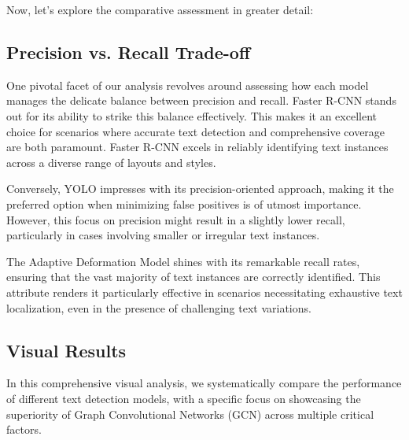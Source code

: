 
Now, let's explore the comparative assessment in greater detail:

\subsection{Precision vs. Recall Trade-off}
One pivotal facet of our analysis revolves around assessing how each model manages the delicate balance between precision and recall. Faster R-CNN stands out for its ability to strike this balance effectively. This makes it an excellent choice for scenarios where accurate text detection and comprehensive coverage are both paramount. Faster R-CNN excels in reliably identifying text instances across a diverse range of layouts and styles.

Conversely, YOLO impresses with its precision-oriented approach, making it the preferred option when minimizing false positives is of utmost importance. However, this focus on precision might result in a slightly lower recall, particularly in cases involving smaller or irregular text instances.

The Adaptive Deformation Model shines with its remarkable recall rates, ensuring that the vast majority of text instances are correctly identified. This attribute renders it particularly effective in scenarios necessitating exhaustive text localization, even in the presence of challenging text variations.



\subsection{Visual Results}
In this comprehensive visual analysis, we systematically compare the performance of different text detection models, with a specific focus on showcasing the superiority of Graph Convolutional Networks (GCN) across multiple critical factors.

